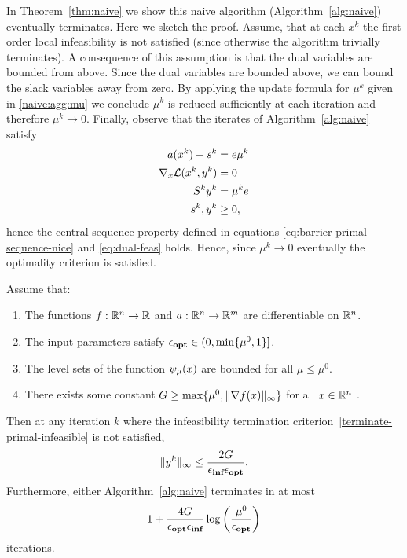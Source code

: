 \documentclass{article}
\begin{document}
In Theorem~\ref{thm:naive} we show this naive algorithm (Algorithm~\ref{alg:naive}) eventually terminates. Here we sketch the proof. Assume, that at each $x^{k}$ the first order local infeasibility is not satisfied (since otherwise the algorithm trivially terminates). A consequence of this assumption is that the dual variables are bounded from above. Since the dual variables are bounded above, we can bound the slack variables away from zero. By applying the update formula for $\mu^{k}$ given in \eqref{naive:agg:mu} we conclude $\mu^{k}$ is reduced sufficiently at each iteration and therefore $\mu^{k} \rightarrow 0$. Finally, observe that the iterates of Algorithm~\ref{alg:naive} satisfy
\begin{subequations}
\begin{flalign}
a(x^{k}) + s^{k} &= e \mu^k \\
\nabla_{x} \mathcal{L}(x^{k}, y^{k}) &= 0 \\
S^{k} y^{k} &= \mu^k e \\
s^{k}, y^{k} &\ge 0,
\end{flalign}
\end{subequations}
hence the central sequence property defined in equations \eqref{eq:barrier-primal-sequence-nice} and \eqref{eq:dual-feas} holds. Hence, since $\mu^k \rightarrow 0$ eventually the optimality criterion is satisfied.

\begin{theorem}\label{thm:naive}
Assume that: 
\begin{enumerate}
\item The functions $f : \mathbb{R}^{n} \rightarrow \mathbb{R}$ and $a : \mathbb{R}^{n} \rightarrow \mathbb{R}^{m}$ are differentiable on $\mathbb{R}^{n}$.
\item The input parameters satisfy $\epsilon_{\textbf{opt}} \in (0, \min\{ \mu^{0}, 1 \} ]$. %
\item The level sets of the function $\psi_{\mu}(x)$ are bounded for all $\mu \le \mu^{0}$.
\item There exists some constant $G \ge \max\{ \mu^{0}, \| \nabla f(x) \|_{\infty} \}$ for all $x \in \mathbb{R}^{n}$ .
\end{enumerate}
Then at any iteration $k$ where the infeasibility termination criterion~\eqref{terminate-primal-infeasible} is not satisfied,
$$
\| y^{k} \|_{\infty} \le \frac{2 G}{ \epsilon_{\textbf{inf}} \epsilon_{\textbf{opt}}}.
$$
Furthermore, either Algorithm~\ref{alg:naive} terminates in at most 
$$
1 + \frac{4 G}{\epsilon_{\textbf{opt}} \epsilon_{\textbf{inf}} } \log\left( \frac{\mu^{0}}{\epsilon_{\textbf{opt}}} \right)
$$
iterations.
\end{theorem}
\end{document}
